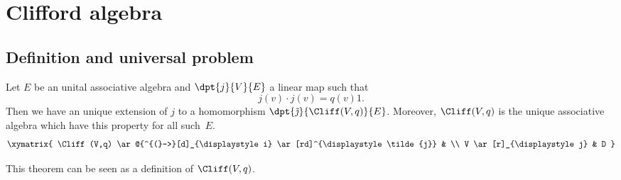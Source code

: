 \section{Clifford algebra}

\subsection{Definition and universal problem}


\begin{theorem}
Let $E$ be an unital associative algebra and $\dpt{j}{V}{E}$ a linear map such that
\begin{equation}
    j(v)\cdot j(v)=q(v)1.        \label{102r1}
\end{equation}
Then we have an unique extension of $j$ to a homomorphism $\dpt{\tilde\jmath}{\Cliff(V,q)}{E}$. Moreover, $\Cliff(V,q)$ is the unique associative algebra which have this property for all such~$E$.
\[
\xymatrix{
    \Cliff(V,q) \ar@{^{(}->}[d]_{\displaystyle i} \ar[rd]^{\displaystyle\tilde{j}} &  \\
    V \ar[r]_{\displaystyle j} & D
  }
\]
\label{tho_Cliffunif}
\end{theorem}
This theorem can be seen as a definition of $\Cliff(V,q)$.


